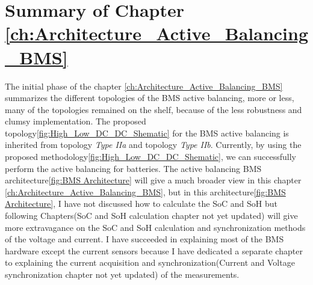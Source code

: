 \section{Summary of Chapter \ref{ch:Architecture_Active_Balancing_BMS}}
The initial phase of the chapter \ref{ch:Architecture_Active_Balancing_BMS} summarizes the different topologies of the BMS active balancing, more or less, many of the topologies remained on the shelf, because of the less robustness and clumsy implementation.
The proposed topology\ref{fig:High_Low_DC_DC_Shematic} for the BMS active balancing is inherited from topology \textit{Type IIa} and topology \textit{Type IIb}. Currently, by using the proposed methodology\ref{fig:High_Low_DC_DC_Shematic}, we can successfully perform the active balancing for batteries.
The active balancing BMS architecture\ref{fig:BMS Architecture} will give a much broader view in this chapter \ref{ch:Architecture_Active_Balancing_BMS}, but in this architecture\ref{fig:BMS Architecture}, I have not discussed how to calculate the SoC and SoH but following Chapters(SoC and SoH calculation chapter not yet updated) will give more extravagance on the SoC and SoH calculation and synchronization methods of the voltage and current. I have succeeded in explaining most of the BMS hardware except the current sensors because I have dedicated a separate chapter to explaining the current acquisition and synchronization(Current and Voltage synchronization chapter not yet updated) of the measurements.